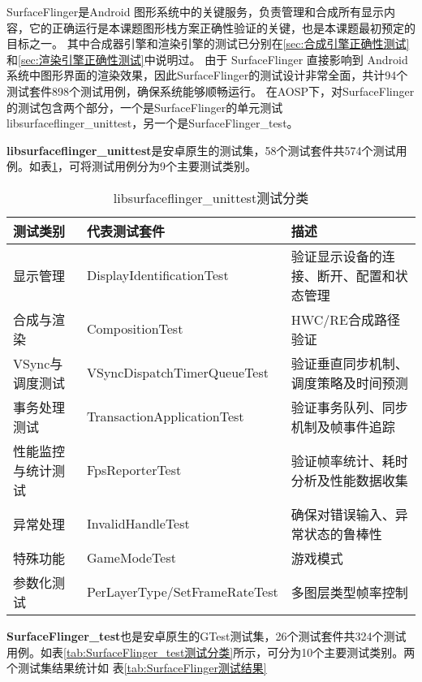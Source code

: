 SurfaceFlinger是Android 图形系统中的关键服务，负责管理和合成所有显示内容，它的正确运行是本课题图形栈方案正确性验证的关键，也是本课题最初预定的目标之一。
其中合成器引擎和渲染引擎的测试已分别在\ref{sec:合成引擎正确性测试}和\ref{sec:渲染引擎正确性测试}中说明过。
由于 SurfaceFlinger 直接影响到 Android 系统中图形界面的渲染效果，因此SurfaceFlinger的测试设计非常全面，共计94个测试套件898个测试用例，确保系统能够顺畅运行。
在AOSP下，对SurfaceFlinger的测试包含两个部分，一个是SurfaceFlinger的单元测试libsurfaceflinger\_unittest，另一个是SurfaceFlinger\_test。

\textbf{libsurfaceflinger\_unittest}是安卓原生的测试集，58个测试套件共574个测试用例。如表\ref{tab:libsurfaceflinger_unittest测试分类}，可将测试用例分为9个主要测试类别。

\begin{table}[H]
    \centering
    \caption{libsurfaceflinger\_unittest测试分类}
    \label{tab:libsurfaceflinger_unittest测试分类}
    \begin{tabular}{lll}
        \toprule
        测试类别 & 代表测试套件	& 描述 \\
        \midrule
        显示管理 & DisplayIdentificationTest & 验证显示设备的连接、断开、配置和状态管理 \\
        合成与渲染 & CompositionTest & HWC/RE合成路径验证 \\
        VSync与调度测试 & VSyncDispatchTimerQueueTest & 验证垂直同步机制、调度策略及时间预测 \\
        事务处理测试 & TransactionApplicationTest & 验证事务队列、同步机制及帧事件追踪 \\
        性能监控与统计测试 & FpsReporterTest & 验证帧率统计、耗时分析及性能数据收集 \\
        异常处理 & InvalidHandleTest & 确保对错误输入、异常状态的鲁棒性 \\
        特殊功能 & GameModeTest & 游戏模式 \\  
        参数化测试 &  PerLayerType/SetFrameRateTest & 多图层类型帧率控制 \\
        \bottomrule
    \end{tabular}
    \note{}
\end{table}

\textbf{SurfaceFlinger\_test}也是安卓原生的GTest测试集，26个测试套件共324个测试用例。如表\ref{tab:SurfaceFlinger_test测试分类}所示，可分为10个主要测试类别。两个测试集结果统计如
表\ref{tab:SurfaceFlinger测试结果}

